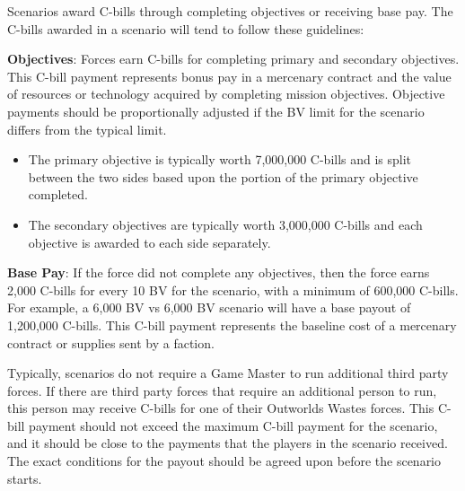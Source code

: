 Scenarios award C-bills through completing objectives or receiving base pay.
The C-bills awarded in a scenario will tend to follow these guidelines:

\begin{description}

\item {\bfseries Objectives}: Forces earn C-bills for completing primary and secondary objectives.
This C-bill payment represents bonus pay in a mercenary contract and the value of resources or technology acquired by completing mission objectives.
Objective payments should be proportionally adjusted if the BV limit for the scenario differs from the typical limit.

\begin{itemize}

\item The primary objective is typically worth 7,000,000 C-bills and is split between the two sides based upon the portion of the primary objective completed.

\item The secondary objectives are typically worth 3,000,000 C-bills and each objective is awarded to each side separately.

\end{itemize}

\item {\bfseries Base Pay}: If the force did not complete any objectives, then the force earns 2,000 C-bills for every 10 BV for the scenario, with a minimum of 600,000 C-bills.
For example, a 6,000 BV vs 6,000 BV scenario will have a base payout of 1,200,000 C-bills.
This C-bill payment represents the baseline cost of a mercenary contract or supplies sent by a faction.

\end{description}

Typically, scenarios do not require a Game Master to run additional third party forces.
If there are third party forces that require an additional person to run, this person may receive C-bills for one of their Outworlds Wastes forces.
This C-bill payment should not exceed the maximum C-bill payment for the scenario, and it should be close to the payments that the players in the scenario received.
The exact conditions for the payout should be agreed upon before the scenario starts.
